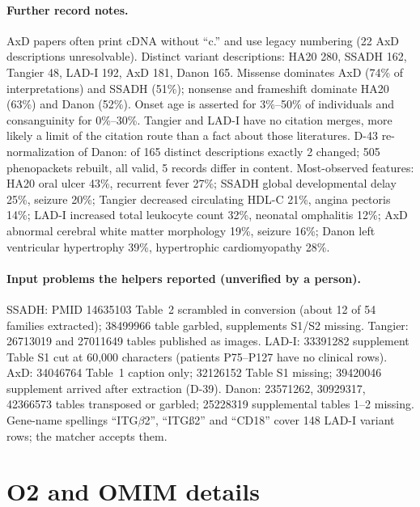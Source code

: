 \documentclass{article} %
\begin{document}
\paragraph{Further record notes.} AxD papers often print cDNA without ``c.'' and use legacy numbering (22 AxD descriptions unresolvable). Distinct variant descriptions: HA20 280, SSADH 162, Tangier 48, LAD-I 192, AxD 181, Danon 165. Missense dominates AxD (74\% of interpretations) and SSADH (51\%); nonsense and frameshift dominate HA20 (63\%) and Danon (52\%). Onset age is asserted for 3\%--50\% of individuals and consanguinity for 0\%--30\%. Tangier and LAD-I have no citation merges, more likely a limit of the citation route than a fact about those literatures. D-43 re-normalization of Danon: of 165 distinct descriptions exactly 2 changed; 505 phenopackets rebuilt, all valid, 5 records differ in content. Most-observed features: HA20 oral ulcer 43\%, recurrent fever 27\%; SSADH global developmental delay 25\%, seizure 20\%; Tangier decreased circulating HDL-C 21\%, angina pectoris 14\%; LAD-I increased total leukocyte count 32\%, neonatal omphalitis 12\%; AxD abnormal cerebral white matter morphology 19\%, seizure 16\%; Danon left ventricular hypertrophy 39\%, hypertrophic cardiomyopathy 28\%.

\paragraph{Input problems the helpers reported (unverified by a person).} SSADH: PMID 14635103 Table~2 scrambled in conversion (about 12 of 54 families extracted); 38499966 table garbled, supplements S1/S2 missing. Tangier: 26713019 and 27011649 tables published as images. LAD-I: 33391282 supplement Table S1 cut at 60,000 characters (patients P75--P127 have no clinical rows). AxD: 34046764 Table~1 caption only; 32126152 Table S1 missing; 39420046 supplement arrived after extraction (D-39). Danon: 23571262, 30929317, 42366573 tables transposed or garbled; 25228319 supplemental tables 1--2 missing. Gene-name spellings ``ITG$\beta$2'', ``ITG\ss{}2'' and ``CD18'' cover 148 LAD-I variant rows; the matcher accepts them.

\FloatBarrier
\section{O2 and OMIM details}
\label{app:o2}
\end{document}
